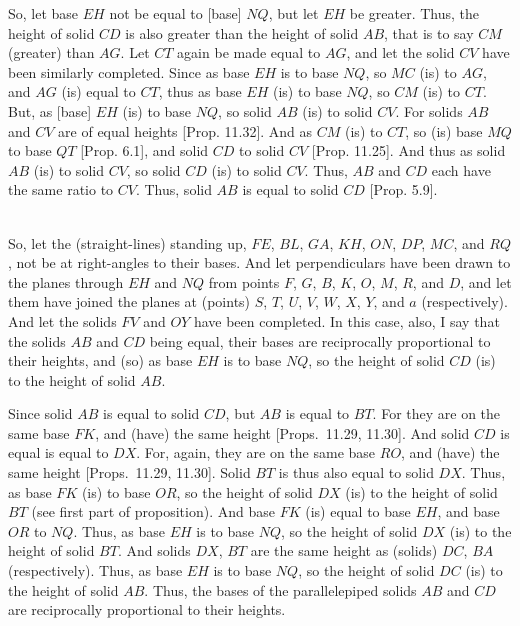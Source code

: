 \begin{Parallel}{}{}
{So, let base $EH$ not be equal to [base] $NQ$, but let $EH$ be greater.
Thus, the height of solid $CD$ is also greater than the height of
solid $AB$, that is to say $CM$ (greater) than $AG$. Let $CT$ again
be made equal to $AG$, and let the solid $CV$ have been similarly
completed.  Since as base $EH$ is to base $NQ$, so $MC$ (is) to
$AG$, and $AG$ (is) equal to $CT$, thus as base $EH$ (is) to
base $NQ$, so $CM$ (is) to $CT$.  But, as [base] $EH$ (is) to base
$NQ$, so solid $AB$ (is) to solid $CV$. For solids $AB$ and $CV$ are of equal heights [Prop. 11.32].
And as $CM$ (is) to $CT$, so (is) base $MQ$ to base $QT$ [Prop. 6.1], and solid $CD$ to solid $CV$ [Prop. 11.25]. And thus as solid $AB$ (is) to solid
$CV$, so solid $CD$ (is) to solid $CV$. Thus, $AB$ and $CD$ each
have the same ratio to $CV$. Thus, solid $AB$ is equal to solid
$CD$ [Prop. 5.9].\\~\\

\epsfysize=3in
\centerline{}

So, let the (straight-lines) standing up, $FE$, $BL$, $GA$, $KH$, $ON$,
$DP$, $MC$, and $RQ$, not be at right-angles to their bases.
And let perpendiculars have been drawn to the planes through $EH$ and
$NQ$ from points $F$, $G$, $B$, $K$, $O$, $M$, $R$, and $D$, 
and let them have joined the planes at (points) $S$, $T$, $U$, $V$, $W$,
$X$, $Y$, and $a$ (respectively). And let the solids $FV$ and $OY$
have been completed. In this case,  also, I say that the solids $AB$ and
$CD$ being equal, their bases are reciprocally proportional to their
heights, and (so) as base $EH$ is to base $NQ$, so the height of
solid $CD$ (is) to the height of solid $AB$.

Since solid $AB$ is equal to solid $CD$, but $AB$ is equal
to $BT$. For they are on the same base $FK$, and (have) the
same height [Props.~11.29, 11.30]. And solid $CD$ is equal is equal to $DX$. For, again,  they are on the same base $RO$, and (have) the same height [Props.~11.29, 11.30]. Solid
$BT$ is thus also equal to solid $DX$. Thus, as base $FK$ (is) to base $OR$,
so the height of solid $DX$ (is) to the height of solid $BT$ (see first part of 
proposition). And base
$FK$ (is) equal to base $EH$, and base $OR$ to $NQ$. Thus, as base
$EH$ is to base $NQ$, so the height of solid $DX$ (is) to the height
of solid $BT$. And solids $DX$, $BT$ are the same
height as (solids) $DC$,  $BA$ (respectively). Thus, as base $EH$
is to base $NQ$, so the height of solid $DC$ (is) to the height of solid
$AB$.  Thus, the bases of the parallelepiped solids $AB$ and $CD$
are reciprocally proportional to their heights.

}
\end{Parallel}
